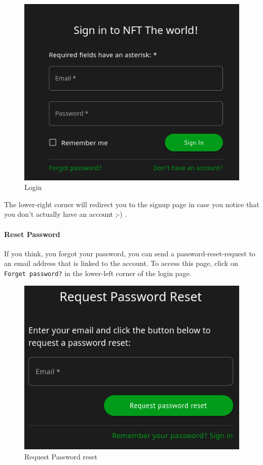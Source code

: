 \documentclass[
]{article}
\begin{document}
\begin{figure}
\centering
\includegraphics{images/login_page.png}
\caption{Login}
\end{figure}\newpage

The lower-right corner will redirect you to the signup page in case you
notice that you don't actually have an account ;-) .

\hypertarget{reset-password}{%
\paragraph{Reset Password}\label{reset-password}}

If you think, you forgot your password, you can send a
password-reset-request to an email address that is linked to the
account. To access this page, click on \texttt{Forget\ password?} in the
lower-left corner of the login page.

\begin{figure}
\centering
\includegraphics{images/password_reset_request.png}
\caption{Request Password reset}
\end{figure}\newpage
\end{document}
